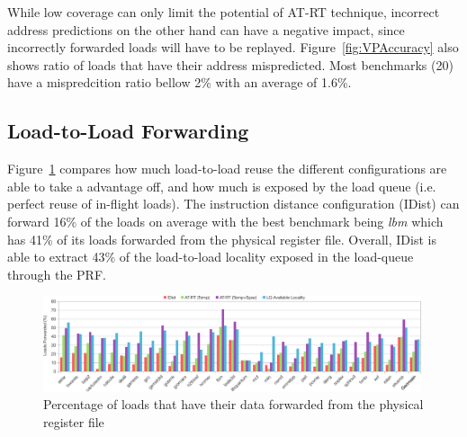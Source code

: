 \documentclass{sig-alternate}
\begin{document}
While low coverage can only limit the potential of AT-RT technique, incorrect address predictions on the other hand can have a negative impact, since incorrectly forwarded loads will have to be replayed. Figure~\ref{fig:VPAccuracy} also shows ratio of loads that have their address mispredicted. Most benchmarks (20) have a mispredcition ratio bellow 2\% with an average of 1.6\%. 








\subsection{Load-to-Load Forwarding}
Figure~\ref{fig:Reuse} compares how much load-to-load reuse the different configurations are able to take a advantage off, and how much is exposed by the load queue (i.e. perfect reuse of in-flight loads). The instruction distance configuration (IDist) can forward 16\% of the loads on average with the best benchmark being \textit{lbm} which has 41\% of its loads forwarded from the physical register file. Overall, IDist is able to extract 43\% of the load-to-load locality exposed in the load-queue through the PRF. 

\begin{figure}[ht]
\centerline{\includegraphics[width=0.99\textwidth]{graphs/RegisterReuse.pdf}}
\caption{Percentage of loads that have their data forwarded from the physical register file}
\label{fig:Reuse}
\end{figure}
\end{document}
